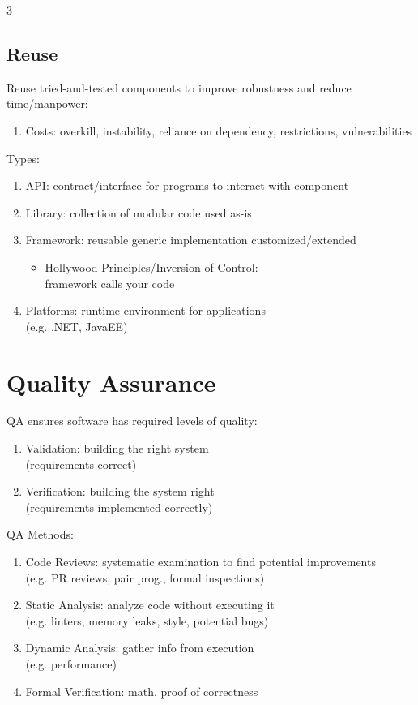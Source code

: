 \documentclass[12pt, a4paper]{article}
\begin{document}
\begin{multicols*}{3}
\subsection{Reuse}
Reuse tried-and-tested components to improve robustness and reduce time/manpower:
\begin{enumerate}[$-$]
  \item Costs: overkill, instability, reliance on dependency, restrictions, vulnerabilities
\end{enumerate}

Types:
\begin{enumerate}[\roman*.]
  \item API: contract/interface for programs to interact with component
  \item Library: collection of modular code used as-is
  \item Framework: reusable generic implementation customized/extended
    \begin{itemize}[leftmargin=*]\vspace{3pt}
      \item Hollywood Principles/Inversion of Control:\\ framework calls your code
    \end{itemize}
  \item Platforms: runtime environment for applications\\(e.g. .NET, JavaEE)
\end{enumerate}
\colbreak

\section{Quality Assurance}
QA ensures software has required levels of quality:
\begin{enumerate}[\roman*.]
  \item Validation: building the right system\\(requirements correct)
  \item Verification: building the system right\\(requirements implemented correctly)
\end{enumerate}

QA Methods:
\begin{enumerate}[\roman*.]
  \item Code Reviews: systematic examination to find potential improvements\\(e.g. PR reviews, pair prog., formal inspections)
  \item Static Analysis: analyze code without executing it\\(e.g. linters, memory leaks, style, potential bugs)
  \item Dynamic Analysis: gather info from execution\\(e.g. performance)
  \item Formal Verification: math. proof of correctness
\end{enumerate}


\end{multicols*}
\end{document}
